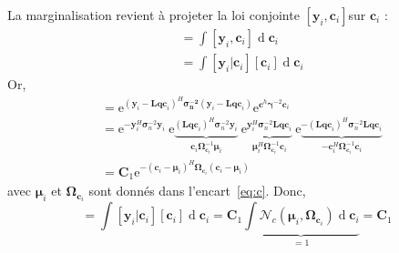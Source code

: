 \documentclass[ 12pt]{article}
\newcommand{\e}{\mathrm{e}}
\begin{document}
La marginalisation revient à projeter la loi conjointe $[\bm{y}_i,\bm{c}_i]$sur $\bm{c}_i$ :
\begin{align*}
        [\bm{y}_i | \infty_{-\bm{c}}] &= \int [\bm{y}_i,\bm{c}_i]  \operatorname{d}\!\bm{c}_i\\
        		&= \int [\bm{y}_i | \bm{c}_i ][\bm{c}_i] \operatorname{d}\!\bm{c}_i
\end{align*}
Or,
\begin{align*}
	 [\bm{y}_i | \bm{c}_i ][\bm{c}_i] &= \e^{(\bm{y}_i - \bm{Lqc}_i)^H \bm{\sigma_n^{-2}}(\bm{y}_i - \bm{Lqc}_i)} \e^{\bm{c}^h \bm{\gamma}^{-2}\bm{c}_i}\\
	 		&= \e^{-\bm{y}_i^H\bm{\sigma}_n^{-2}\bm{y}_i}
	 		\	\e\underbrace{^{(\bm{Lqc}_i)^H\bm{\sigma}_n^{-2}\bm{y}_i}}_{ \bm{c}_i\bm{\Omega}_{\bm{c}_i}^{-1} \bm{\mu}_i}
	 		\	\e\underbrace{^{\bm{y}_i^H\bm{\sigma}_n^{-2}\bm{Lqc}_i}}_{\bm{\mu}_i^H \bm{\Omega}_{\bm{c}_i}^{-1}\bm{c}_i}
	 		\	\e\underbrace{^{-(\bm{Lqc}_i)^H \bm{\sigma}_n^{-2}\bm{Lqc}_i}}_{-\bm{c}_i^H \bm{\Omega}_{\bm{c}_i}^{-1}\bm{c}_i}\\
	 		&= \bm{C}_1 \e^{-(\bm{c}_i-\bm{\mu}_i)^H \bm{\Omega}_{\bm{c}_i}(\bm{c}_i-\bm{\mu}_i) }
\end{align*}
avec $\bm{\mu}_i$ et $\bm{\Omega}_{\bm{c}_i}$ sont donnés dans l'encart~\eqref{eq:c}. Donc,
\begin{equation*}
	      [\bm{y}_i | \infty_{-\bm{c}}]  = \int [\bm{y}_i | \bm{c}_i ][\bm{c}_i] \operatorname{d} \bm{c}_i = \bm{C}_1 \underbrace{ \int \mathcal{N}_c(\bm{\mu}_i, \bm{\Omega}_{\bm{c}_i})\operatorname{d}\!\bm{c}_i }_{=1}= \bm{C}_1
\end{equation*}
\end{document}
